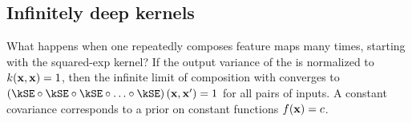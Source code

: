 \subsection{Infinitely deep kernels}
What happens when one repeatedly composes feature maps many times, starting with the squared-exp kernel?
If the output variance of the \kSE{} is normalized to ${k({\bf{x}},{\bf{x}}) = 1}$, then the infinite limit of composition with \kSE{} converges to ${\left(\kSE \circ \kSE \circ \kSE \circ \ldots \circ \kSE\right)(\vx,\vx') = 1}$ for all pairs of inputs.
A constant covariance corresponds to a prior on constant functions ${f({\bf{x}}) = c}$.

%


